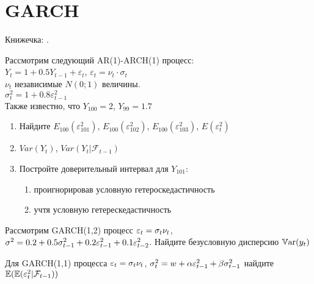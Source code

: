 

\chapter{GARCH}

Книжечка: \cite{francq2019garch}.



\begin{problem}
Рассмотрим следующий AR(1)-ARCH(1) процесс: \\
$Y_{t}=1+0.5Y_{t-1}+\varepsilon_{t}$, $\varepsilon_{t}=\nu_{t}\cdot \sigma_{t}$ \\
$\nu_{t}$ независимые $N(0;1)$ величины. \\
$\sigma^{2}_{t}=1+0.8\varepsilon^{2}_{t-1}$\\
Также известно, что $Y_{100}=2$, $Y_{99}=1.7$
\begin{enumerate}
\item Найдите $E_{100}(\varepsilon^{2}_{101})$, $E_{100}(\varepsilon^{2}_{102})$, $E_{100}(\varepsilon^{2}_{103})$, $E(\varepsilon^{2}_{t})$
\item $Var(Y_{t})$, $Var(Y_{t}|\mathcal{F}_{t-1})$
\item Постройте доверительный интервал для $Y_{101}$:
\begin{enumerate}
\item проигнорировав условную гетероскедастичность
\item учтя условную гетерескедастичность
\end{enumerate}
\end{enumerate}
\begin{sol}
\end{sol}
\end{problem}




\begin{problem}
Рассмотрим GARCH(1,2) процесс $\varepsilon_t=\sigma_t \nu_t$, $\sigma^2=0.2+0.5\sigma^2_{t-1}+0.2\varepsilon_{t-1}^2+0.1\varepsilon_{t-2}^2$. Найдите безусловную дисперсию $\operatorname{\mathbb{V}\mathrm{ar}}(y_t)$
\begin{sol}

\end{sol}
\end{problem}


\begin{problem}
Для GARCH(1,1) процесса $\varepsilon_t=\sigma_t \nu_t$, $\sigma^2_{t}= w + \alpha \varepsilon_{t-1}^2+ \beta \sigma^2_{t-1}$ найдите $\operatorname{\mathbb{E}}( \operatorname{\mathbb{E}}(\varepsilon_t^2 | \mathcal{F}_{t-1} ) )$
\begin{sol}

\end{sol}
\end{problem}



